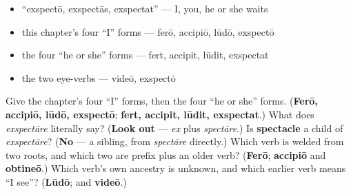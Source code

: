 \begin{itemize}
\raggedright
  \item \textquotedblleft{}exspectō, exspectās, exspectat\textquotedblright{} — I, you, he or she waits
  \item this chapter's four \textquotedblleft{}I\textquotedblright{} forms — ferō, accipiō, lūdō, exspectō
  \item the four \textquotedblleft{}he or she\textquotedblright{} forms — fert, accipit, lūdit, exspectat
  \item the two eye-verbs — videō, exspectō
\end{itemize}

\begin{tcolorbox}[breakable,colback=teal!4,colframe=teal!35!black,title={Before you move on}]
Give the chapter's four \textquotedblleft{}I\textquotedblright{} forms, then the four \textquotedblleft{}he or she\textquotedblright{} forms. (\textbf{Ferō, accipiō, lūdō, exspectō}; \textbf{fert, accipit, lūdit, exspectat}.) What does \emph{exspectāre} literally say? (\textbf{Look out} — \emph{ex} plus \emph{spectāre}.) Is \textbf{spectacle} a child of \emph{exspectāre}? (\textbf{No} — a sibling, from \emph{spectāre} directly.) Which verb is welded from two roots, and which two are prefix plus an older verb? (\textbf{Ferō}; \textbf{accipiō} and \textbf{obtineō}.) Which verb's own ancestry is unknown, and which earlier verb means \textquotedblleft{}I see\textquotedblright{}? (\textbf{Lūdō}; and \textbf{videō}.)
\end{tcolorbox}

